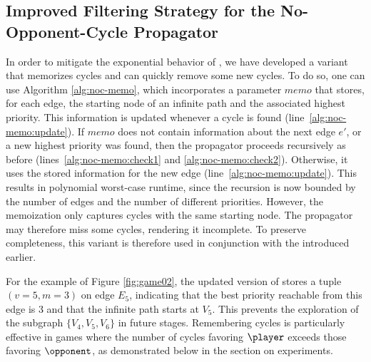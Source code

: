 \documentclass[runningheads]{llncs}
\begin{document}
\subsection{Improved Filtering Strategy for the No-Opponent-Cycle Propagator}

In order to mitigate the exponential behavior of \noceager, we have developed a variant that memorizes cycles and can quickly remove some new cycles. To do so, one can use Algorithm \ref{alg:noc-memo}, which incorporates a parameter $\textit{memo}$ that stores, for each edge, the starting node of an infinite path and the associated highest priority. This information is updated whenever a cycle is found (line~\ref{alg:noc-memo:update}). If $\textit{memo}$ does not contain information about the next edge $e'$, or a new highest priority was found, then the propagator proceeds recursively as before (lines~\ref{alg:noc-memo:check1} and \ref{alg:noc-memo:check2}). Otherwise, it uses the stored information for the new edge (line~\ref{alg:noc-memo:update}). 
This results in polynomial worst-case runtime, since the recursion is now bounded by the number of edges and the number of different priorities. However, the memoization only captures cycles with the same starting node. The propagator may therefore miss some cycles, rendering it incomplete. To preserve completeness, this variant is therefore used in conjunction with the \nocchecker introduced earlier.

For the example of Figure \ref{fig:game02}, the updated version of \noc stores a tuple $(v=5, m=3)$ on edge $E_5$, indicating that the best priority reachable from this edge is 3 and that the infinite path starts at $V_5$. This prevents the exploration of the subgraph $\{V_4, V_5, V_6\}$ in future stages.
%
Remembering cycles is particularly effective in games where the number of cycles favoring $\player$ exceeds those favoring $\opponent$, as demonstrated below in the section on experiments.
\end{document}

